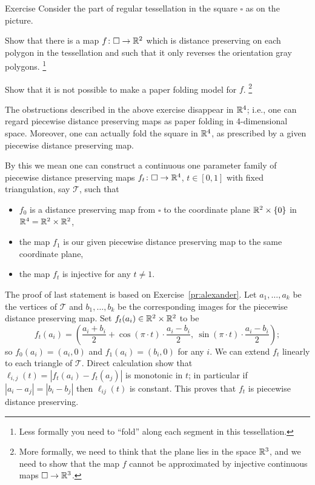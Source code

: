 \begin{thm}{Exercise}\label{pr:6-4-3-4}
Consider the part of regular tessellation in the square $\square$ as on the picture.

Show that there is a map $f\colon\square\to\mathbb{R}^2$ which is distance preserving on each polygon in the tessellation 
and such that it
only reverses the orientation gray polygons.%
\footnote{Less formally you need to ``fold'' along each segment in this tessellation.} 

Show that it is not possible to make a paper folding model for $f$.%
\footnote{More formally, we need to think that the plane lies in the space $\mathbb{R}^3$, 
and we need to show that the map $f$ cannot be approximated by injective continuous maps $\square\to \mathbb{R}^3$.}
\end{thm}

The obstructions described in the above exercise disappear in $\mathbb{R}^4$;
i.e., one can regard piecewise distance preserving maps as paper folding in 4-dimensional space. 
Moreover, one can actually fold the square in $\mathbb{R}^4$, as prescribed by a given piecewise distance preserving map.

By this we mean one can construct a continuous one parameter family of piecewise distance preserving maps $f_t\colon\square\to\mathbb{R}^4$, $t\in[0,1]$ with fixed triangulation, say $\mathcal{T}$,
such that
\begin{itemize}
\item $f_0$ is a distance preserving map from $\square$ to the coordinate plane $\mathbb{R}^2\times \{0\}$ in $\mathbb{R}^4=\mathbb{R}^2\times\mathbb{R}^2$,
\item the map $f_1$ is our given piecewise distance preserving map to the same coordinate plane,
\item the map $f_t$ is injective for any $t\ne1$.
\end{itemize}

The proof of last statement is based on Exercise~\ref{pr:alexander}.
Let $a_1,\dots,a_k$ 
be the vertices of $\mathcal{T}$
and $b_1,\dots,b_k$ be the corresponding images for the piecewise distance preserving map.
Set $f_t(a_i)\in\mathbb{R}^2\times\mathbb{R}^2$ to be 
$$f_t(a_i)= \left(\frac{a_i + b_i}{2} + 
\cos(\pi\cdot t)\cdot \frac{a_i - b_i}2,\  
\sin(\pi\cdot t)\cdot \frac{a_i - b_i}2\right);
$$
so $f_0(a_i)=(a_i,0)$ and $f_1(a_i)=(b_i,0)$ for any $i$.
We can extend $f_t$ linearly to each triangle of $\mathcal{T}$.
Direct calculation show that $\ell_{i,j}(t)=|f_t(a_i)-f_t(a_j)|$ is  monotonic in $t$;
in particular if $|a_i-a_j|=|b_i-b_j|$ 
then $\ell_{ij}(t)$ is constant.
This proves that $f_t$ is piecewise distance preserving.

